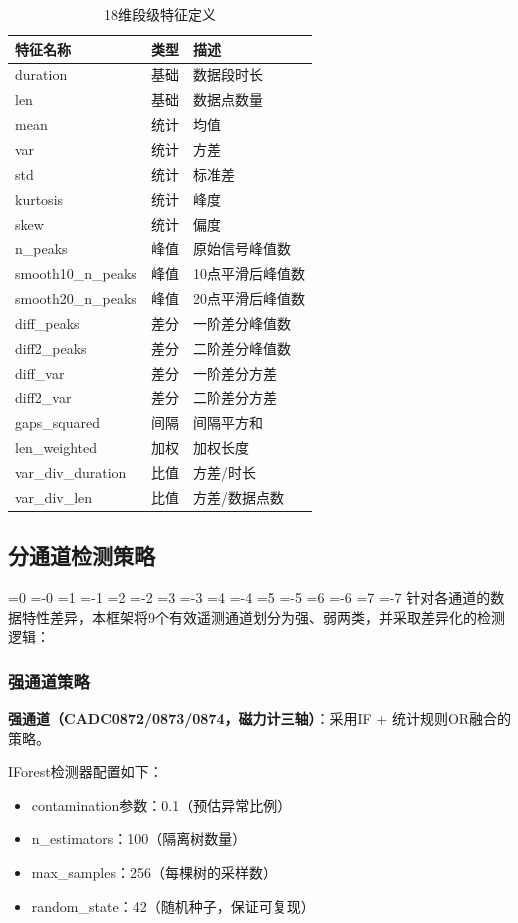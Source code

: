 \documentclass[12pt, a4paper]{article}
\newcommand{\zihao}[1]{%
    \ifnum#1=0 {\fontsize{42pt}{50pt}\selectfont}%
    \else\ifnum#1=-0 {\fontsize{36pt}{44pt}\selectfont}%
    \else\ifnum#1=1 {\fontsize{26pt}{32pt}\selectfont}%
    \else\ifnum#1=-1 {\fontsize{24pt}{28pt}\selectfont}%
    \else\ifnum#1=2 {\fontsize{22pt}{26pt}\selectfont}%
    \else\ifnum#1=-2 {\fontsize{18pt}{22pt}\selectfont}%
    \else\ifnum#1=3 {\fontsize{16pt}{20pt}\selectfont}%
    \else\ifnum#1=-3 {\fontsize{15pt}{18pt}\selectfont}%
    \else\ifnum#1=4 {\fontsize{14pt}{17pt}\selectfont}%
    \else\ifnum#1=-4 {\fontsize{12pt}{15pt}\selectfont}%
    \else\ifnum#1=5 {\fontsize{10.5pt}{13pt}\selectfont}%
    \else\ifnum#1=-5 {\fontsize{9pt}{11pt}\selectfont}%
    \else\ifnum#1=6 {\fontsize{7.5pt}{9pt}\selectfont}%
    \else\ifnum#1=-6 {\fontsize{6.5pt}{8pt}\selectfont}%
    \else\ifnum#1=7 {\fontsize{5.5pt}{7pt}\selectfont}%
    \else\ifnum#1=-7 {\fontsize{5pt}{6pt}\selectfont}%
    \fi\fi\fi\fi\fi\fi\fi\fi\fi\fi\fi\fi\fi\fi\fi\fi
}
\newcommand{\songti}{\CJKfontspec{SimSun}}
\begin{document}
\begin{table}[H]
\centering
\caption{18维段级特征定义}
\label{tab:features}
\begin{tabular}{lll}
\toprule
特征名称 & 类型 & 描述 \\
\midrule
duration & 基础 & 数据段时长 \\
len & 基础 & 数据点数量 \\
mean & 统计 & 均值 \\
var & 统计 & 方差 \\
std & 统计 & 标准差 \\
kurtosis & 统计 & 峰度 \\
skew & 统计 & 偏度 \\
n\_peaks & 峰值 & 原始信号峰值数 \\
smooth10\_n\_peaks & 峰值 & 10点平滑后峰值数 \\
smooth20\_n\_peaks & 峰值 & 20点平滑后峰值数 \\
diff\_peaks & 差分 & 一阶差分峰值数 \\
diff2\_peaks & 差分 & 二阶差分峰值数 \\
diff\_var & 差分 & 一阶差分方差 \\
diff2\_var & 差分 & 二阶差分方差 \\
gaps\_squared & 间隔 & 间隔平方和 \\
len\_weighted & 加权 & 加权长度 \\
var\_div\_duration & 比值 & 方差/时长 \\
var\_div\_len & 比值 & 方差/数据点数 \\
\bottomrule
\end{tabular}
\end{table}

\subsection{分通道检测策略}

\zihao{5}\songti
针对各通道的数据特性差异，本框架将9个有效遥测通道划分为强、弱两类，并采取差异化的检测逻辑：

\subsubsection{强通道策略}

\textbf{强通道（CADC0872/0873/0874，磁力计三轴）}：采用IF + 统计规则OR融合的策略。

IForest检测器配置如下：
\begin{itemize}
    \item contamination参数：0.1（预估异常比例）
    \item n\_estimators：100（隔离树数量）
    \item max\_samples：256（每棵树的采样数）
    \item random\_state：42（随机种子，保证可复现）
\end{itemize}
\end{document}
